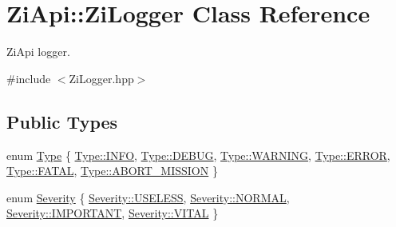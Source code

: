 \hypertarget{classZiApi_1_1ZiLogger}{}\section{Zi\+Api\+::Zi\+Logger Class Reference}
\label{classZiApi_1_1ZiLogger}


Zi\+Api logger.  




{\ttfamily \#include $<$Zi\+Logger.\+hpp$>$}

\subsection*{Public Types}
\begin{DoxyCompactItemize}
\item 
enum \mbox{\hyperlink{classZiApi_1_1ZiLogger_a2344ef7fcc5f37cac04a3efc8f993424}{Type}} \{ \newline
\mbox{\hyperlink{classZiApi_1_1ZiLogger_a2344ef7fcc5f37cac04a3efc8f993424a551b723eafd6a31d444fcb2f5920fbd3}{Type\+::\+I\+N\+FO}}, 
\mbox{\hyperlink{classZiApi_1_1ZiLogger_a2344ef7fcc5f37cac04a3efc8f993424adc30ec20708ef7b0f641ef78b7880a15}{Type\+::\+D\+E\+B\+UG}}, 
\mbox{\hyperlink{classZiApi_1_1ZiLogger_a2344ef7fcc5f37cac04a3efc8f993424a059e9861e0400dfbe05c98a841f3f96b}{Type\+::\+W\+A\+R\+N\+I\+NG}}, 
\mbox{\hyperlink{classZiApi_1_1ZiLogger_a2344ef7fcc5f37cac04a3efc8f993424abb1ca97ec761fc37101737ba0aa2e7c5}{Type\+::\+E\+R\+R\+OR}}, 
\newline
\mbox{\hyperlink{classZiApi_1_1ZiLogger_a2344ef7fcc5f37cac04a3efc8f993424a19da7170bea36556dde582519795f3fc}{Type\+::\+F\+A\+T\+AL}}, 
\mbox{\hyperlink{classZiApi_1_1ZiLogger_a2344ef7fcc5f37cac04a3efc8f993424a94668888264efde6cbdf61c98181438a}{Type\+::\+A\+B\+O\+R\+T\+\_\+\+M\+I\+S\+S\+I\+ON}}
 \}
\item 
enum \mbox{\hyperlink{classZiApi_1_1ZiLogger_a483a2cb1e6000a67acba1c903f780225}{Severity}} \{ \mbox{\hyperlink{classZiApi_1_1ZiLogger_a483a2cb1e6000a67acba1c903f780225aa85f1b757c08be14396a953d5faa53d8}{Severity\+::\+U\+S\+E\+L\+E\+SS}}, 
\mbox{\hyperlink{classZiApi_1_1ZiLogger_a483a2cb1e6000a67acba1c903f780225a1e23852820b9154316c7c06e2b7ba051}{Severity\+::\+N\+O\+R\+M\+AL}}, 
\mbox{\hyperlink{classZiApi_1_1ZiLogger_a483a2cb1e6000a67acba1c903f780225a279ac5dd73c3a5783ebeb10e172c4f38}{Severity\+::\+I\+M\+P\+O\+R\+T\+A\+NT}}, 
\mbox{\hyperlink{classZiApi_1_1ZiLogger_a483a2cb1e6000a67acba1c903f780225a9aae234ac22c4866ee4f69601e3c4fa6}{Severity\+::\+V\+I\+T\+AL}}
 \}
\item 

\end{DoxyCompactItemize}
